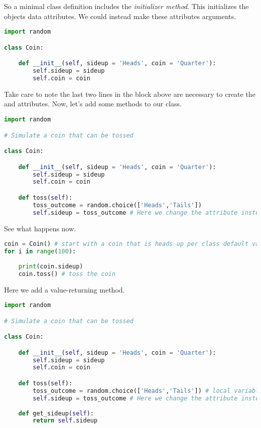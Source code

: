 So a minimal class definition includes the  \emph{initializer method}. This initializes the objects data attributes. We could instead make these attributes arguments.


\begin{lstlisting}[language = Python]
import random 

class Coin: 

    def __init__(self, sideup = 'Heads', coin = 'Quarter'):
        self.sideup = sideup
        self.coin = coin
\end{lstlisting}

\smallskip
\noindent Take care to note the last two lines in the block above are necessary to create the  and  attributes. Now, let's add some methods to our class.

\begin{lstlisting}[language = Python]
import random 

# Simulate a coin that can be tossed

class Coin: 

    def __init__(self, sideup = 'Heads', coin = 'Quarter'):
        self.sideup = sideup
        self.coin = coin

    def toss(self):
        toss_outcome = random.choice(['Heads','Tails'])
        self.sideup = toss_outcome # Here we change the attribute instead of returning a value
\end{lstlisting}

See what happens now. 

\begin{lstlisting}[language = Python]
coin = Coin() # start with a coin that is heads up per class default value
for i in range(100):
    
    print(coin.sideup)
    coin.toss() # toss the coin
\end{lstlisting}

\smallskip
\noindent Here we add a value-returning method. 

\begin{lstlisting}[language = Python]
import random 

# Simulate a coin that can be tossed

class Coin: 

    def __init__(self, sideup = 'Heads', coin = 'Quarter'):
        self.sideup = sideup
        self.coin = coin

    def toss(self):
        toss_outcome = random.choice(['Heads','Tails']) # local variable just like before in defining functions
        self.sideup = toss_outcome # Here we change the attribute instead of returning a value
        
    def get_sideup(self):
        return self.sideup
\end{lstlisting}


